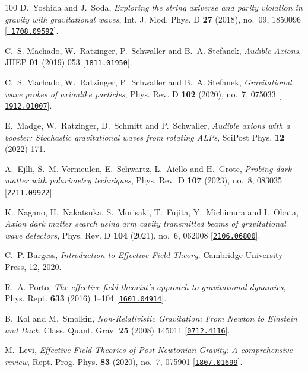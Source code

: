 \begin{thebibliography}{100}
D.~Yoshida and J.~Soda,  {\em {Exploring the string axiverse and parity
  violation in gravity with gravitational waves}}, Int. J. Mod. Phys. D {\bf
  27} (2018), no.~09, 1850096 [\href{http://www.arXiv.org/abs/1708.09592}{{\tt
  1708.09592}}].

C.~S. Machado, W.~Ratzinger, P.~Schwaller and B.~A. Stefanek,  {\em {Audible
  Axions}}, JHEP {\bf 01} (2019) 053
  [\href{http://www.arXiv.org/abs/1811.01950}{{\tt 1811.01950}}].

C.~S. Machado, W.~Ratzinger, P.~Schwaller and B.~A. Stefanek,  {\em
  {Gravitational wave probes of axionlike particles}}, Phys. Rev. D {\bf 102}
  (2020), no.~7, 075033 [\href{http://www.arXiv.org/abs/1912.01007}{{\tt
  1912.01007}}].

E.~Madge, W.~Ratzinger, D.~Schmitt and P.~Schwaller,  {\em {Audible axions with
  a booster: Stochastic gravitational waves from rotating ALPs}}, SciPost Phys.
  {\bf 12} (2022) 171.

A.~Ejlli, S.~M. Vermeulen, E.~Schwartz, L.~Aiello and H.~Grote,  {\em {Probing
  dark matter with polarimetry techniques}}, Phys. Rev. D {\bf 107} (2023),
  no.~8, 083035 [\href{http://www.arXiv.org/abs/2211.09922}{{\tt 2211.09922}}].

K.~Nagano, H.~Nakatsuka, S.~Morisaki, T.~Fujita, Y.~Michimura and I.~Obata,
  {\em {Axion dark matter search using arm cavity transmitted beams of
  gravitational wave detectors}}, Phys. Rev. D {\bf 104} (2021), no.~6, 062008
  [\href{http://www.arXiv.org/abs/2106.06800}{{\tt 2106.06800}}].

C.~P. Burgess, {\em {Introduction to Effective Field Theory}}.
\newblock Cambridge University Press, 12, 2020.

R.~A. Porto,  {\em {The effective field theorist\textquoteright{}s approach to
  gravitational dynamics}}, Phys. Rept. {\bf 633} (2016) 1--104
  [\href{http://www.arXiv.org/abs/1601.04914}{{\tt 1601.04914}}].

B.~Kol and M.~Smolkin,  {\em {Non-Relativistic Gravitation: From Newton to
  Einstein and Back}}, Class. Quant. Grav. {\bf 25} (2008) 145011
  [\href{http://www.arXiv.org/abs/0712.4116}{{\tt 0712.4116}}].

M.~Levi,  {\em {Effective Field Theories of Post-Newtonian Gravity: A
  comprehensive review}}, Rept. Prog. Phys. {\bf 83} (2020), no.~7, 075901
  [\href{http://www.arXiv.org/abs/1807.01699}{{\tt 1807.01699}}].


\end{thebibliography}
